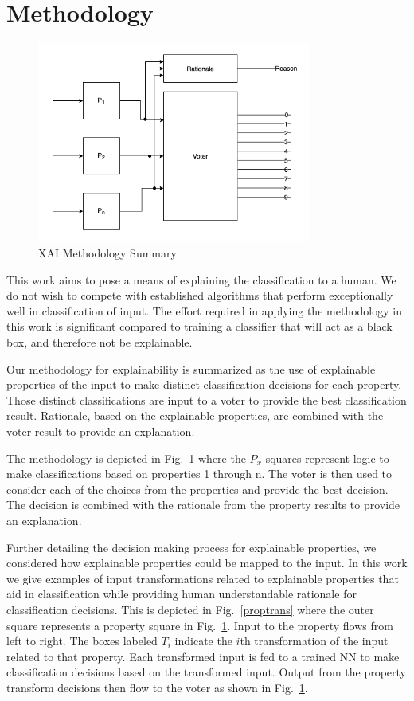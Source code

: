 \documentclass[conference]{IEEEtran}
\begin{document}
\section{Methodology}

 \begin{figure}[htbp]
\centerline{\includegraphics[width=90mm]{./images/voting_prop_nn.png}}
\caption{XAI Methodology Summary}
\label{voting}
\end{figure}

This work aims to pose a means of explaining the classification to a human.  We do not wish to compete with established algorithms that perform exceptionally well in classification of input.   The effort required in applying the methodology in this work is significant compared to training a classifier that will act as a black box, and therefore not be explainable.

Our methodology for explainability is summarized as the use of explainable properties of the input to make distinct classification decisions for each property.  Those distinct classifications are input to a voter to provide the best classification result.  Rationale, based on the explainable properties, are combined with the voter result to provide an explanation. 

The methodology is depicted in Fig.~\ref{voting} where the $P_x$ squares represent logic to make classifications based on properties 1 through n.  The voter is then used to consider each of the choices from the properties and provide the best decision.  The decision is combined with the rationale from the property results to provide an explanation.

Further detailing the decision making process for explainable properties, we considered how explainable properties could be mapped to the input.  In this work we give examples of input transformations related to explainable properties that aid in classification while providing human understandable rationale for classification decisions.  This is depicted in Fig.~\ref{proptrans} where the outer square represents a property square in Fig.~\ref{voting}.  Input to the property flows from left to right.  The boxes labeled $T_i$ indicate the $i$th transformation of the input related to that property.  Each transformed input is fed to a trained NN to make classification decisions based on the transformed input.  Output from the property transform decisions then flow to the voter as shown in Fig.~\ref{voting}.
\end{document}
